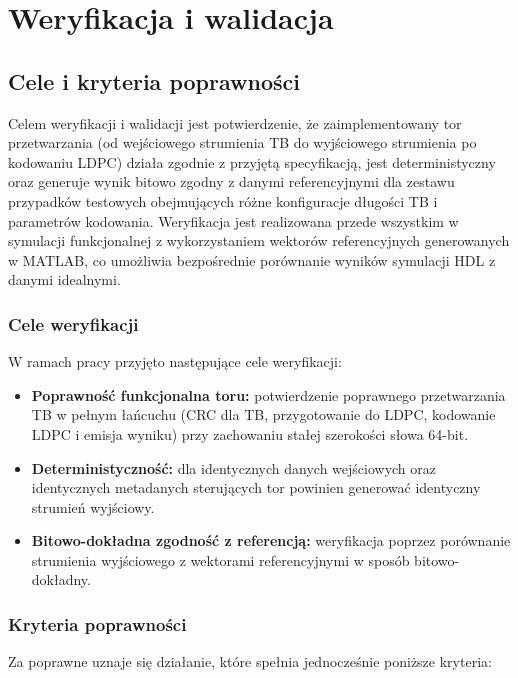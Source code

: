 \chapter{Weryfikacja i walidacja}
\label{ch:weryfikacja_i_walidacja}

\section{Cele i kryteria poprawności}
\label{sec:walidacja_cele_kryteria}

Celem weryfikacji i walidacji jest potwierdzenie, że zaimplementowany tor przetwarzania
(od wejściowego strumienia TB do wyjściowego strumienia po kodowaniu LDPC) działa
zgodnie z przyjętą specyfikacją, jest deterministyczny oraz generuje wynik bitowo zgodny
z danymi referencyjnymi dla zestawu przypadków testowych obejmujących różne konfiguracje
długości TB i parametrów kodowania. Weryfikacja jest realizowana przede wszystkim
w symulacji funkcjonalnej z wykorzystaniem wektorów referencyjnych generowanych w MATLAB,
co umożliwia bezpośrednie porównanie wyników symulacji HDL z danymi idealnymi. 

\subsection{Cele weryfikacji}

W ramach pracy przyjęto następujące cele weryfikacji:
\begin{itemize}
    \item \textbf{Poprawność funkcjonalna toru:} potwierdzenie poprawnego przetwarzania TB w pełnym łańcuchu
    (CRC dla TB, przygotowanie do LDPC, kodowanie LDPC i emisja wyniku) przy zachowaniu stałej szerokości słowa 64-bit.
    \item \textbf{Deterministyczność:} dla identycznych danych wejściowych oraz identycznych metadanych sterujących
    tor powinien generować identyczny strumień wyjściowy. 
    \item \textbf{Bitowo-dokładna zgodność z referencją:} weryfikacja poprzez porównanie strumienia wyjściowego z wektorami
    referencyjnymi w sposób bitowo-dokładny. 
\end{itemize}

\subsection{Kryteria poprawności}

Za poprawne uznaje się działanie, które spełnia jednocześnie poniższe kryteria:

